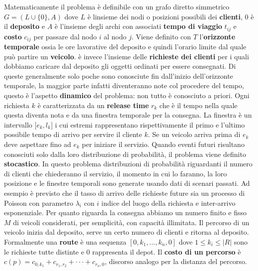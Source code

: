 \documentclass[
    article,            %
    12pt,                %
    oneside,            %
    a4paper,            %
    english,            %
    italian,                %
    sumario=tradicional,
]{abntex2}
\begin{document}
Matematicamente il problema è definibile con un grafo diretto simmetrico {\(G = (L \cup \{ 0\},A)\)} dove {\(L\)} è l\textquotesingle insieme dei nodi o posizioni possibili dei \textbf{clienti}, {\(0\)} è il \textbf{deposito} e {\(A\)} è l'insieme degli archi con associati \textbf{tempo di viaggio} {\(t_{ij}\)} e \textbf{costo} {\(c_{ij}\)} per passare dal nodo {\(i\)} al nodo {\(j\)}. \newline Viene definito con {\(T\)} l'\textbf{orizzonte temporale} ossia le ore lavorative del deposito e quindi l'orario limite dal quale può partire un \textbf{veicolo}.  è invece l'insieme delle \textbf{richieste dei clienti} per i quali dobbiamo caricare dal deposito gli oggetti ordinati per essere consegnati. Di queste generalmente solo poche sono conosciute fin dall'inizio dell'orizzonte temporale, la maggior parte infatti diventeranno note col procedere del tempo, questo è l'aspetto \textbf{dinamico} del problema: non tutto è conosciuto a priori.
\newline
Ogni richiesta {\(k\)} è caratterizzata da un \textbf{release time} {\(r_{k}\)} che è il tempo nella quale questa diventa nota e da una finestra temporale per la consegna. La finestra è un intervallo {\(\lbrack e_{k},l_{k}\rbrack\)} i cui estremi rappresentano rispettivamente il primo e l'ultimo possibile tempo di arrivo per servire il cliente $k$. Se un veicolo arriva prima di $e_k$ deve aspettare fino ad $e_k$ per iniziare il servizio.
\newline
Quando eventi futuri risultano conosciuti solo dalla loro distribuzione di probabilità, il problema viene definito \textbf{stocastico}. In questo problema distribuzioni di probabilità riguardanti il numero di clienti che chiederanno il servizio, il momento in cui lo faranno, la loro posizione e le finestre temporali sono generate usando dati di scenari passati. Ad esempio è previsto che il tasso di arrivo delle richieste future sia un processo di Poisson con parametro {\(\lambda_{i}\)} con {\(i\)} indice del luogo della richiesta e inter-arrivo esponenziale.
\newline
Per quanto riguarda la consegna abbiamo un numero finito e fisso {\(M\)} di veicoli considerati, per semplicità, con capacità illimitata. Il percorso di un veicolo inizia dal deposito, serve un certo numero di clienti e ritorna al deposito. Formalmente una \textbf{route} è una sequenza $[0,k_1,...,k_n,0]$ dove $1 \leq k_i \leq |R|$ sono le richieste tutte distinte e $0$ rappresenta il depot. Il \textbf{costo di un percorso} è $c(p) = c_{0,k_1} + c_{r_1,r_2}+ \cdot \cdot \cdot + c_{r_n,0}$, discorso analogo per la distanza del percorso.
\end{document}
